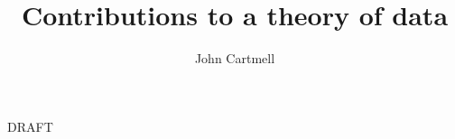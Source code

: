 \documentclass[10pt,a4paper]{article}
\begin{document}
\title{Contributions to a theory of data}
\author{John Cartmell}
\maketitle
\begin{center}
DRAFT
\end{center}


% 




%

% 
%
	 
\end{document}
